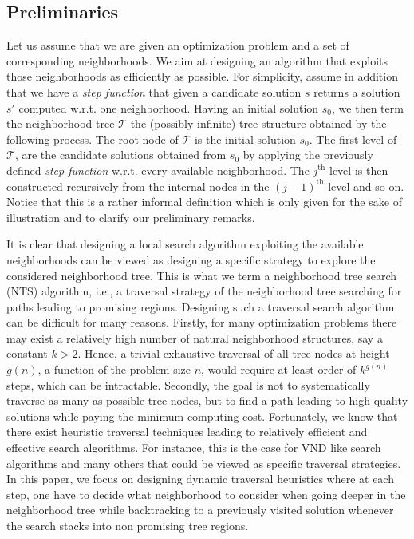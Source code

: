 \documentclass{acm_proc_article-sp}
\newcommand{\m}[1]{\mathcal{#1}}
\begin{document}
\subsection{Preliminaries}
Let us assume that we are given an optimization problem and a set of corresponding neighborhoods. We aim at designing an algorithm that exploits those neighborhoods as efficiently as possible. For simplicity, assume in addition that we have a \emph{step function} that given a candidate solution $s$ returns a solution $s'$ computed w.r.t. one neighborhood. Having an initial solution $s_0$, we then term the neighborhood tree $\m{T}$ the (possibly infinite) tree structure obtained by the following process. The root node of $\m{T}$ is the initial solution $s_0$. The first level of $\m{T}$, are the candidate solutions obtained from $s_0$ by applying the previously defined \emph{step function} w.r.t. every available neighborhood. The $j^{\textrm{th}}$ level is then constructed recursively from the internal nodes in the $(j-1)^{\textrm{th}}$ level and so on. Notice that this is a rather informal definition which is only given for the sake of illustration and to clarify our preliminary remarks.

It is clear that designing a local search algorithm exploiting the available neighborhoods can be viewed as designing a specific strategy to explore the considered neighborhood tree. This is what we term a neighborhood tree search (NTS) algorithm, i.e., a traversal strategy of the neighborhood tree searching for paths leading to promising regions. Designing such a traversal search algorithm can be difficult for many reasons. Firstly, for many optimization problems there may exist a relatively high number of natural neighborhood structures, say a constant $k>2$. Hence, a trivial exhaustive traversal of all tree nodes at height $g(n)$, a function of the problem size $n$, would require at least order of $k^{g(n)}$ steps, which can be intractable. Secondly, the goal is not to systematically traverse as many as possible tree nodes, but to find a path leading to high quality solutions while paying the minimum computing cost. Fortunately, we know that there exist heuristic traversal techniques leading to relatively efficient and effective search algorithms. For instance, this is the case for VND like search algorithms and many others that could be viewed as specific traversal strategies. In this paper, we focus on designing dynamic traversal heuristics where at each step, one have to decide what neighborhood to consider when going deeper in the neighborhood tree while backtracking to a previously visited solution whenever the search stacks into non promising tree regions.
\end{document}
